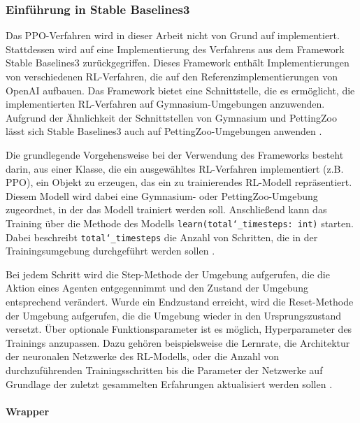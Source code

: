 \subsubsection{Einführung in Stable Baselines3}

Das PPO-Verfahren wird in dieser Arbeit nicht von Grund auf implementiert. Stattdessen wird auf eine Implementierung des Verfahrens aus dem Framework Stable Baselines3 zurückgegriffen. Dieses Framework enthält Implementierungen von verschiedenen RL-Verfahren, die auf den Referenzimplementierungen von OpenAI aufbauen. Das Framework bietet eine Schnittstelle, die es ermöglicht, die implementierten RL-Verfahren auf Gymnasium-Umgebungen anzuwenden. Aufgrund der Ähnlichkeit der Schnittstellen von Gymnasium und PettingZoo lässt sich Stable Baselines3 auch auf PettingZoo-Umgebungen anwenden \cite{Raffin.2021} \cite{Farama.2025}.

Die grundlegende Vorgehensweise bei der Verwendung des Frameworks besteht darin, aus einer Klasse, die ein ausgewähltes RL-Verfahren implementiert (z.B. PPO), ein Objekt zu erzeugen, das ein zu trainierendes RL-Modell repräsentiert. Diesem Modell wird dabei eine Gymnasium- oder PettingZoo-Umgebung zugeordnet, in der das Modell trainiert werden soll. Anschließend kann das Training über die Methode des Modells \texttt{learn(total\char`_timesteps: int)} starten. Dabei beschreibt \texttt{total\char`_timesteps} die Anzahl von Schritten, die in der Trainingsumgebung durchgeführt werden sollen \cite{Raffin.2021}.

Bei jedem Schritt wird die Step-Methode der Umgebung aufgerufen, die die Aktion eines Agenten entgegennimmt und den Zustand der Umgebung entsprechend verändert. Wurde ein Endzustand erreicht, wird die Reset-Methode der Umgebung aufgerufen, die die Umgebung wieder in den Ursprungszustand versetzt. Über optionale Funktionsparameter ist es möglich, Hyperparameter des Trainings anzupassen. Dazu gehören beispielsweise die Lernrate, die Architektur der neuronalen Netzwerke des RL-Modells, oder die Anzahl von durchzuführenden Trainingsschritten bis die Parameter der Netzwerke auf Grundlage der zuletzt gesammelten Erfahrungen aktualisiert werden sollen \cite{Raffin.2021}.

\paragraph{Wrapper}

\label{wrapper}

